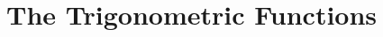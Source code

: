 \documentclass[../analysis1.tex]{subfiles}
\begin{document}
\chapter{The Trigonometric Functions}
\end{document}
